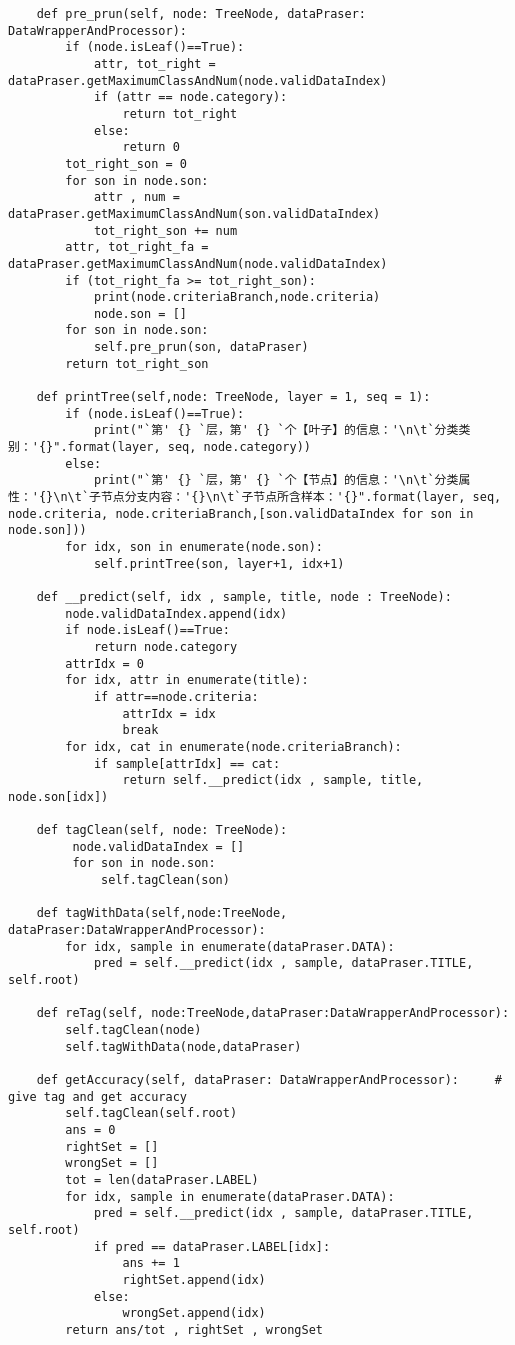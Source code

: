 \documentclass{ctexart}
\begin{document}
\begin{lstlisting}
    def pre_prun(self, node: TreeNode, dataPraser: DataWrapperAndProcessor):
        if (node.isLeaf()==True):
            attr, tot_right = dataPraser.getMaximumClassAndNum(node.validDataIndex)
            if (attr == node.category):
                return tot_right
            else: 
                return 0
        tot_right_son = 0
        for son in node.son:
            attr , num = dataPraser.getMaximumClassAndNum(son.validDataIndex)
            tot_right_son += num
        attr, tot_right_fa = dataPraser.getMaximumClassAndNum(node.validDataIndex)
        if (tot_right_fa >= tot_right_son):
            print(node.criteriaBranch,node.criteria)
            node.son = []
        for son in node.son:
            self.pre_prun(son, dataPraser)
        return tot_right_son
    
    def printTree(self,node: TreeNode, layer = 1, seq = 1):
        if (node.isLeaf()==True):
            print("`第' {} `层，第' {} `个【叶子】的信息：'\n\t`分类类别：'{}".format(layer, seq, node.category))
        else:
            print("`第' {} `层，第' {} `个【节点】的信息：'\n\t`分类属性：'{}\n\t`子节点分支内容：'{}\n\t`子节点所含样本：'{}".format(layer, seq, node.criteria, node.criteriaBranch,[son.validDataIndex for son in node.son]))
        for idx, son in enumerate(node.son):
            self.printTree(son, layer+1, idx+1)

    def __predict(self, idx , sample, title, node : TreeNode):
        node.validDataIndex.append(idx)
        if node.isLeaf()==True:
            return node.category
        attrIdx = 0
        for idx, attr in enumerate(title):
            if attr==node.criteria:
                attrIdx = idx
                break
        for idx, cat in enumerate(node.criteriaBranch):
            if sample[attrIdx] == cat:
                return self.__predict(idx , sample, title, node.son[idx])
    
    def tagClean(self, node: TreeNode):
         node.validDataIndex = []
         for son in node.son:
             self.tagClean(son)
    
    def tagWithData(self,node:TreeNode, dataPraser:DataWrapperAndProcessor):
        for idx, sample in enumerate(dataPraser.DATA):
            pred = self.__predict(idx , sample, dataPraser.TITLE, self.root)
    
    def reTag(self, node:TreeNode,dataPraser:DataWrapperAndProcessor):
        self.tagClean(node)
        self.tagWithData(node,dataPraser)
    
    def getAccuracy(self, dataPraser: DataWrapperAndProcessor):     # give tag and get accuracy
        self.tagClean(self.root)
        ans = 0
        rightSet = []
        wrongSet = []
        tot = len(dataPraser.LABEL)
        for idx, sample in enumerate(dataPraser.DATA):
            pred = self.__predict(idx , sample, dataPraser.TITLE, self.root)
            if pred == dataPraser.LABEL[idx]:
                ans += 1
                rightSet.append(idx)
            else:
                wrongSet.append(idx)
        return ans/tot , rightSet , wrongSet
    

\end{lstlisting}
\end{document}
